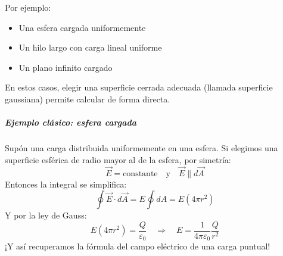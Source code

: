 Por ejemplo:
\begin{itemize}
    \item Una esfera cargada uniformemente
    \item Un hilo largo con carga lineal uniforme
    \item Un plano infinito cargado
\end{itemize}

En estos casos, elegir una superficie cerrada adecuada (llamada superficie gaussiana) permite calcular  de forma directa.

\subparagraph{Ejemplo clásico: esfera cargada}

Supón una carga  distribuida uniformemente en una esfera. Si elegimos una superficie esférica de radio  mayor al de la esfera, por simetría:
\[
\vec{E} = \text{constante} \quad \text{y} \quad \vec{E} \parallel d\vec{A}
\]
Entonces la integral se simplifica:
\[
\oint \vec{E} \cdot d\vec{A} = E \oint dA = E(4\pi r^2)
\]
Y por la ley de Gauss:
\[
E(4\pi r^2) = \frac{Q}{\varepsilon_0} \quad \Rightarrow \quad E = \frac{1}{4\pi\varepsilon_0} \frac{Q}{r^2}
\]
¡Y así recuperamos la fórmula del campo eléctrico de una carga puntual!

